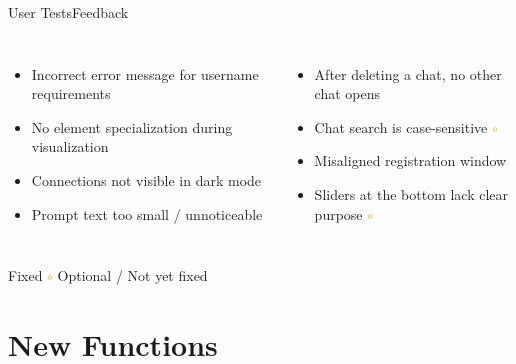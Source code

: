 \documentclass{sdqbeamer}[en]
\begin{document}
\begin{frame}{User Tests}{Feedback}
  \begin{columns}
    \begin{itemize}
      \item Incorrect error message for username requirements \textcolor{green}{\checkmark}
      \item No element specialization during visualization \textcolor{green}{\checkmark}
      \item Connections not visible in dark mode \textcolor{green}{\checkmark}
      \item Prompt text too small / unnoticeable \textcolor{green}{\checkmark}
    \end{itemize}
    \begin{itemize}
      \item After deleting a chat, no other chat opens \textcolor{green}{\checkmark}
      \item Chat search is case-sensitive \textcolor{orange}{$\circ$}
      \item Misaligned registration window \textcolor{green}{\checkmark}
      \item Sliders at the bottom lack clear purpose \textcolor{orange}{$\circ$}
    \end{itemize}
  \end{columns}
  \vspace{1em}
  {\small \textcolor{green}{\checkmark} Fixed \quad \textcolor{orange}{$\circ$} Optional / Not yet fixed}
\end{frame}
\section{New Functions}
\end{document}
